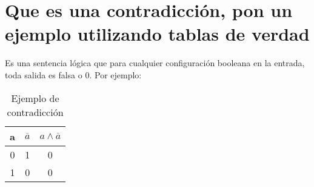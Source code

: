 \section{Que es una contradicción, pon un ejemplo utilizando tablas de verdad}
Es una sentencia lógica que para cualquier configuración booleana en la entrada, toda salida es falsa o 0. Por ejemplo:
\begin{table}[!ht]
    \centering
    \begin{tabular}{|c|c|c|}
        \hline
        a & $\overline{a}$ & $a \wedge \overline{a}$ \\
        \hline
        0 & 1 & 0 \\
        \hline
        1 & 0 & 0 \\
        \hline
    \end{tabular}
    \caption{Ejemplo de contradicción}\label{table:contradiccion}
\end{table}